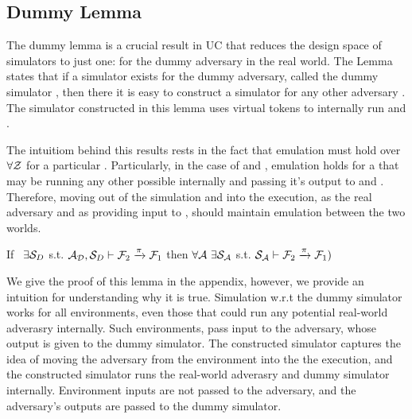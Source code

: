 \subsection{Dummy Lemma} \label{sec:dummy}
The dummy lemma is a crucial result in UC that reduces the design space of simulators to just one: for the dummy adversary in the real world.
The Lemma states that if a simulator exists for the dummy adversary, called the dummy simulator \DS, then there it is easy to construct a simulator for any other adversary \A. 
The simulator constructed in this lemma uses virtual tokens to internally run \DS and \A.

The intuitiom behind this results rests in the fact that emulation must hold over $\forall \mathcal{Z}$ for a particular \A. 
Particularly, in the case of \DS and \DummyAdv, emulation holds for a \Z that may be running any other possible \A internally and passing it's output to \DS and \DummyAdv.
Therefore, moving \A out of the simulation and into the execution, as the real adversary and as providing input to \DS, should maintain emulation between the two worlds.

\begin{theorem}\label{thm:dummy}
If \ $\exists \mathcal{S}_{D}$ s.t. $ \mathcal{A}_\mathcal{D}, \mathcal{S}_{D} \vdash \mathcal{F}_2 \xrightarrow{\pi} \mathcal{F}_1$ then $\forall \mathcal{A} \ \exists \mathcal{S}_\mathcal{A}$ s.t. $\mathcal{S}_{\mathcal{A}} \vdash  \mathcal{F}_2 \xrightarrow{\pi} \mathcal{F}_1)$ 
\end{theorem}

We give the proof of this lemma in the appendix, however, we provide an intuition for understanding why it is true.
Simulation w.r.t the dummy simulator works for all environments, even those that could run any potential real-world adverasry internally. Such environments, pass input to the adversary, whose output is given to the dummy simulator. 
The constructed simulator captures the idea of moving the adversary from the environment into the the execution, and the constructed simulator runs the real-world adverasry and dummy simulator internally.
Environment inputs are not passed to the adversary, and the adversary's outputs are passed to the dummy simulator.


